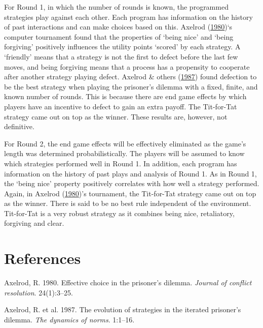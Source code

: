 \documentclass[11pt,preprint, authoryear]{elsarticle}
\numberwithin{equation}{section}
\numberwithin{figure}{section}
\numberwithin{table}{section}
\newlength{\cslhangindent}
\newenvironment{CSLReferences}%
  {\setlength{\parindent}{0pt}%
  \everypar{\setlength{\hangindent}{\cslhangindent}}\ignorespaces}%
  {\par}
\begin{document}
For Round 1, in which the number of rounds is known, the programmed
strategies play against each other. Each program has information on the
history of past interactions and can make choices based on this. Axelrod
(\protect\hyperlink{ref-axelrod1980}{1980})`s computer tournament found
that the properties of `being nice' and `being forgiving' positively
influences the utility points `scored' by each strategy. A `friendly'
means that a strategy is not the first to defect before the last few
moves, and being forgiving means that a process has a propensity to
cooperate after another strategy playing defect. Axelrod \& others
(\protect\hyperlink{ref-axelrod1987evolution}{1987}) found defection to
be the best strategy when playing the prisoner's dilemma with a fixed,
finite, and known number of rounds. This is because there are end game
effects by which players have an incentive to defect to gain an extra
payoff. The Tit-for-Tat strategy came out on top as the winner. These
results are, however, not definitive.

For Round 2, the end game effects will be effectively eliminated as the
game's length was determined probabilistically. The players will be
assumed to know which strategies performed well in Round 1. In addition,
each program has information on the history of past plays and analysis
of Round 1. As in Round 1, the `being nice' property positively
correlates with how well a strategy performed. Again, in Axelrod
(\protect\hyperlink{ref-axelrod1980}{1980})'s tournament, the
Tit-for-Tat strategy came out on top as the winner. There is said to be
no best rule independent of the environment. Tit-for-Tat is a very
robust strategy as it combines being nice, retaliatory, forgiving and
clear.

\newpage

\hypertarget{references}{%
\section*{References}\label{references}}

\hypertarget{refs}{}
\begin{CSLReferences}{1}{0}
\leavevmode{}%
Axelrod, R. 1980. Effective choice in the prisoner's dilemma.
\emph{Journal of conflict resolution}. 24(1):3--25.

\leavevmode{}%
Axelrod, R. et al. 1987. The evolution of strategies in the iterated
prisoner's dilemma. \emph{The dynamics of norms}. 1:1--16.

\end{CSLReferences}


\end{document}

